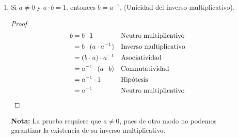 \documentclass[11pt]{article}
\begin{document}
\begin{enumerate}[label=\alph*)]
    \item Si $a\neq 0$ y $a\cdot b =1$, entonces $b=a^{-1}$. (Unicidad del inverso multiplicativo).
    \vspace{-1em}
    \begin{proof} 
    \begin{align*}
        b &= b \cdot 1 && \text{Neutro multiplicativo}\\
        &= b \cdot (a\cdot a^{-1}) && \text{Inverso multiplicativo}\\
        &= (b\cdot a) \cdot a^{-1} && \text{Asociatividad}\\
        &= a^{-1} \cdot (a\cdot b) && \text{Conmutatividad}\\
        &= a^{-1} \cdot 1 && \text{Hipótesis}\\
        &= a^{-1} && \text{Neutro multiplicativo} \qedhere
    \end{align*}    
    \end{proof} \vspace{-1em}
    \textbf{Nota:} La prueba requiere que $a\neq 0$, pues de otro modo no podemos garantizar la existencia de su inverso multiplicativo.
    

\end{enumerate}
\end{document}
